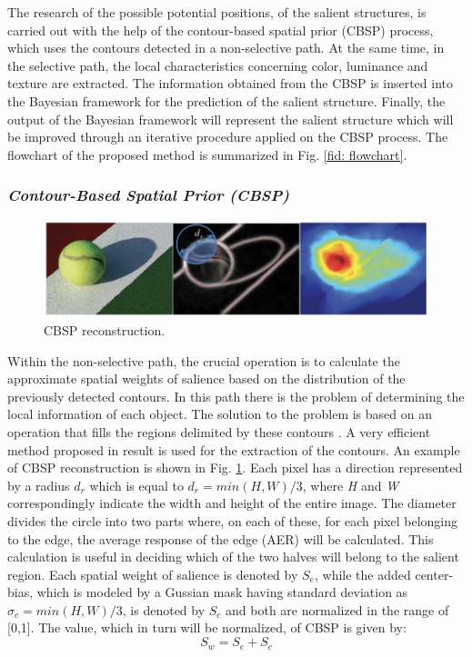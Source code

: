 The research of the possible potential positions, of the salient structures, is 
carried out with the help of the contour-based spatial prior (CBSP) process, 
which uses the contours detected in a non-selective path. At the same time, 
in the selective path, the local characteristics concerning color, luminance 
and texture are extracted. The information obtained from the CBSP is inserted 
into the Bayesian framework for the prediction of the salient structure. 
Finally, the output of the Bayesian framework will represent the salient structure 
which will be improved through an iterative procedure applied on the 
CBSP process. The flowchart of the proposed method is summarized in Fig. \ref{fid: flowchart}.

\subsubsection{\emph{Contour-Based Spatial Prior (CBSP)}}
\begin{figure}[htbp]
    \centering
    \includegraphics[width = 0.8\linewidth]{images/paper1/CBSP.png}
    \centering
    \caption{CBSP reconstruction.}
    \label{fid: CBSP}
\end{figure}
Within the non-selective path, the crucial operation is to calculate the 
approximate spatial weights of salience based on the distribution of the previously 
detected contours. In this path there is the problem of determining 
the local information of each object. The solution to the problem is based 
on an operation that fills the regions delimited by these contours \cite{0747815567}. A very 
efficient method proposed in \cite{0747815570} result is used for the extraction of the contours.
An example of CBSP reconstruction is shown in Fig. \ref{fid: CBSP}. Each pixel 
has a direction represented by a radius $ d_r $ which is equal to $d_r = min (H, W) / 3$, where 
\emph{H} and \emph{W} correspondingly indicate the width and height of the entire image.
The diameter divides the circle into two parts where, on each of these, for 
each pixel belonging to the edge, the average response of the edge (AER) will 
be calculated. This calculation is useful in deciding which of the two halves 
will belong to the salient region. Each spatial weight of salience is denoted 
by $ S_e $, while the added center-bias, which is modeled by a Gussian 
mask having standard deviation as $ \sigma_c = min (H, W) / 3 $, is denoted by $ S_c $ and 
both are normalized in the range of [0,1]. The value, which in turn will be 
normalized, of CBSP is given by: $$ S_w = S_e + S_c $$

